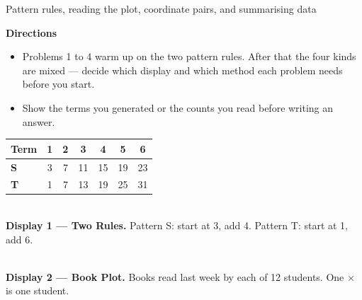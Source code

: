 \documentclass[12pt]{article}
\begin{document}

\begin{center}
{\small Pattern rules, reading the plot, coordinate pairs, and summarising data}
\end{center}

\noindent\textbf{Directions}
\begin{itemize}[leftmargin=0.9cm, itemsep=1pt, topsep=2pt]
  \item Problems 1 to 4 warm up on the two pattern rules. After that the four kinds are mixed --- decide which display and which method each problem needs before you start.
  \item Show the terms you generated or the counts you read before writing an answer.
\end{itemize}

\vspace{0.15cm}
\noindent\begin{minipage}[t]{0.52\linewidth}
\vspace{0pt}
\begin{center}
\begin{tabular}{|l|c|c|c|c|c|c|}
\hline
\textbf{Term} & 1 & 2 & 3 & 4 & 5 & 6 \\ \hline
\textbf{S} & 3 & 7 & 11 & 15 & 19 & 23 \\ \hline
\textbf{T} & 1 & 7 & 13 & 19 & 25 & 31 \\ \hline
\end{tabular}\\[0.15cm]
{\scriptsize \textbf{Display 1 --- Two Rules.} Pattern S: start at 3, add 4. Pattern T: start at 1, add 6.}
\end{center}
\end{minipage}\hfill
\begin{minipage}[t]{0.44\linewidth}
\vspace{0pt}
\begin{center}
\\[0.3cm]
{\scriptsize \textbf{Display 2 --- Book Plot.} Books read last week by each of 12 students. One $\times$ is one student.}
\end{center}
\end{minipage}
\end{document}
